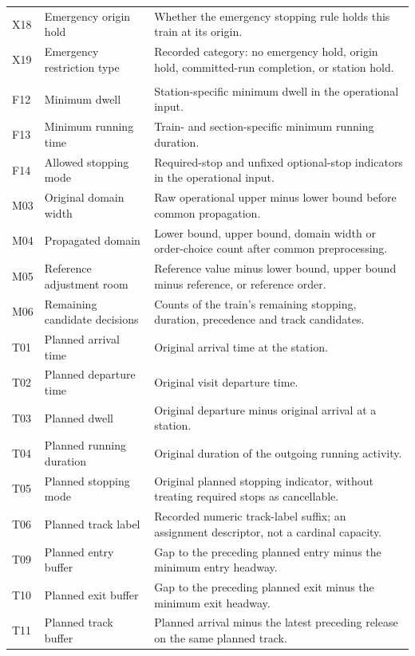 \begin{longtable}{@{}>{\raggedright\arraybackslash}p{0.8cm}>{\raggedright\arraybackslash}p{3.7cm}>{\raggedright\arraybackslash}p{10.0cm}@{}}
X18 & Emergency origin hold & Whether the emergency stopping rule holds this train at its origin. \\
X19 & Emergency restriction type & Recorded category: no emergency hold, origin hold, committed-run completion, or station hold. \\
\multicolumn{3}{@{}l}{\textbf{Timetable characteristics}}\\*[2pt]
F12 & Minimum dwell & Station-specific minimum dwell in the operational input. \\
F13 & Minimum running time & Train- and section-specific minimum running duration. \\
F14 & Allowed stopping mode & Required-stop and unfixed optional-stop indicators in the operational input. \\
M03 & Original domain width & Raw operational upper minus lower bound before common propagation. \\
M04 & Propagated domain & Lower bound, upper bound, domain width or order-choice count after common preprocessing. \\
M05 & Reference adjustment room & Reference value minus lower bound, upper bound minus reference, or reference order. \\
M06 & Remaining candidate decisions & Counts of the train's remaining stopping, duration, precedence and track candidates. \\
T01 & Planned arrival time & Original arrival time at the station. \\
T02 & Planned departure time & Original visit departure time. \\
T03 & Planned dwell & Original departure minus original arrival at a station. \\
T04 & Planned running duration & Original duration of the outgoing running activity. \\
T05 & Planned stopping mode & Original planned stopping indicator, without treating required stops as cancellable. \\
T06 & Planned track label & Recorded numeric track-label suffix; an assignment descriptor, not a cardinal capacity. \\
T09 & Planned entry buffer & Gap to the preceding planned entry minus the minimum entry headway. \\
T10 & Planned exit buffer & Gap to the preceding planned exit minus the minimum exit headway. \\
T11 & Planned track buffer & Planned arrival minus the latest preceding release on the same planned track. \\

\end{longtable}

